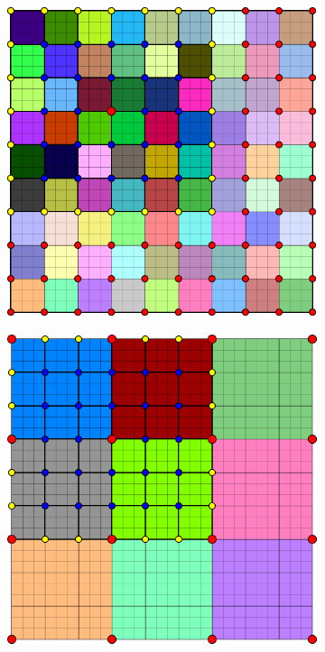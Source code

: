 \begin{figure}[htbp]
  \begin{subfigure}[t]{0.3\textwidth}
    \centerline{\includegraphics[width=0.9\linewidth]{figs/square/square_cart_struct_node_ml_lvl1_grid}}
  \end{subfigure}
  \hfill
  \begin{subfigure}[t]{0.3\textwidth}
    \centerline{\includegraphics[width=0.9\linewidth]{figs/square/square_cart_struct_node_ml_lvl2_grid}}

\end{subfigure}
\end{figure}
